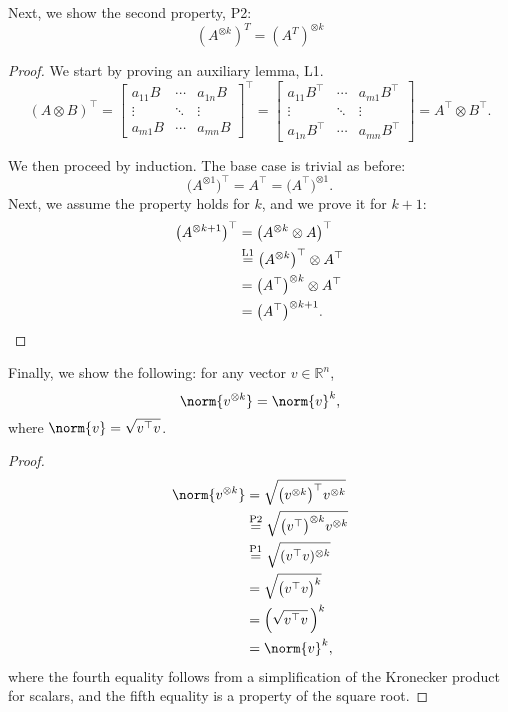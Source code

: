 \documentclass[11pt]{article}
\newcommand{\kp}{\otimes} %
\begin{document}
Next, we show the second property, P2:
\[(A^{\kp k})^T = (A^T)^{\kp k}
\]
\begin{proof}
We start by proving an auxiliary lemma, L1.
\[
(A \kp B)^\top = \begin{bmatrix}
a_{11} B & \cdots & a_{1n}B \\
\vdots & \ddots & \vdots \\
a_{m1} B & \cdots & a_{mn} B
\end{bmatrix}^\top = \begin{bmatrix}
a_{11} B^\top & \cdots & a_{m1}B^\top \\
\vdots & \ddots & \vdots \\
a_{1n} B^\top & \cdots & a_{mn} B^\top
\end{bmatrix} = A^\top \kp B^\top.
\]

We then proceed by induction.
The base case is trivial as before:
\[
\big(A^{\kp 1}\big)^\top = A^\top = \big(A^\top\big)^{\kp 1}.
\]
Next, we assume the property holds for $k$, and we prove it for $k+1$:
\begin{align*}
\big(A^{\kp k+1}\big)^\top &= \big(A^{\kp k} \kp A\big)^\top\\
&\overset{\textnormal{L1}}{=} \big(A^{\kp k}\big)^\top \kp A^\top\\
&= \big(A^\top\big)^{\kp k} \kp A^\top\\
&= \big(A^\top\big)^{\kp k+1}.\qedhere
\end{align*}
\end{proof}

Finally, we show the following:
for any vector \(v \in \mathbb{R}^n\),
\[
\norm{v^{\kp k}} = \norm{v}^{k},
\]
where \(\norm{v} = \sqrt{v^\top v}\).
\begin{proof}
\begin{align*}
\norm{v^{\kp k}} &= \sqrt{\big(v^{\kp k}\big)^\top v^{\kp k}}\\
&\overset{\textnormal{P2}}{=} \sqrt{\big(v^\top\big)^{\kp k} v^{\kp k}}\\
&\overset{\textnormal{P1}}{=} \sqrt{(v^\top v)^{\kp k}}\\
&= \sqrt{\big(v^\top v\big)^k}\\
&= \Big(\sqrt{v^\top v}\,\Big)^k\\
&= \norm{v}^k,
\end{align*}
where the fourth equality follows from a simplification of the Kronecker product for scalars, and the fifth equality is a property of the square root.
\end{proof}
\end{document}
